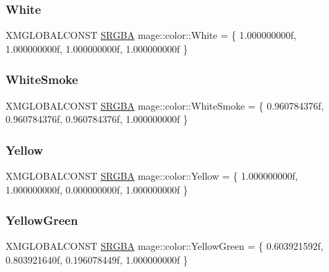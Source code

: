 \hypertarget{namespacemage_1_1color_a799c518dd6b5f05e1a75ee06e7ed9651}{}\label{namespacemage_1_1color_a799c518dd6b5f05e1a75ee06e7ed9651} 
\subsubsection{\texorpdfstring{White}{White}}
{\footnotesize\ttfamily X\+M\+G\+L\+O\+B\+A\+L\+C\+O\+N\+ST \hyperlink{structmage_1_1_s_r_g_b_a}{S\+R\+G\+BA} mage\+::color\+::\+White = \{ 1.\+000000000f, 1.\+000000000f, 1.\+000000000f, 1.\+000000000f \}}

\hypertarget{namespacemage_1_1color_af06dc9acfb11fea4058a93f0b79bc217}{}\label{namespacemage_1_1color_af06dc9acfb11fea4058a93f0b79bc217} 
\subsubsection{\texorpdfstring{White\+Smoke}{WhiteSmoke}}
{\footnotesize\ttfamily X\+M\+G\+L\+O\+B\+A\+L\+C\+O\+N\+ST \hyperlink{structmage_1_1_s_r_g_b_a}{S\+R\+G\+BA} mage\+::color\+::\+White\+Smoke = \{ 0.\+960784376f, 0.\+960784376f, 0.\+960784376f, 1.\+000000000f \}}

\hypertarget{namespacemage_1_1color_ad57da99577741e2fdcc8d6b01bb784cb}{}\label{namespacemage_1_1color_ad57da99577741e2fdcc8d6b01bb784cb} 
\subsubsection{\texorpdfstring{Yellow}{Yellow}}
{\footnotesize\ttfamily X\+M\+G\+L\+O\+B\+A\+L\+C\+O\+N\+ST \hyperlink{structmage_1_1_s_r_g_b_a}{S\+R\+G\+BA} mage\+::color\+::\+Yellow = \{ 1.\+000000000f, 1.\+000000000f, 0.\+000000000f, 1.\+000000000f \}}

\hypertarget{namespacemage_1_1color_a6d85b53793a5a5cb525a25a3c65490a1}{}\label{namespacemage_1_1color_a6d85b53793a5a5cb525a25a3c65490a1} 
\subsubsection{\texorpdfstring{Yellow\+Green}{YellowGreen}}
{\footnotesize\ttfamily X\+M\+G\+L\+O\+B\+A\+L\+C\+O\+N\+ST \hyperlink{structmage_1_1_s_r_g_b_a}{S\+R\+G\+BA} mage\+::color\+::\+Yellow\+Green = \{ 0.\+603921592f, 0.\+803921640f, 0.\+196078449f, 1.\+000000000f \}}

